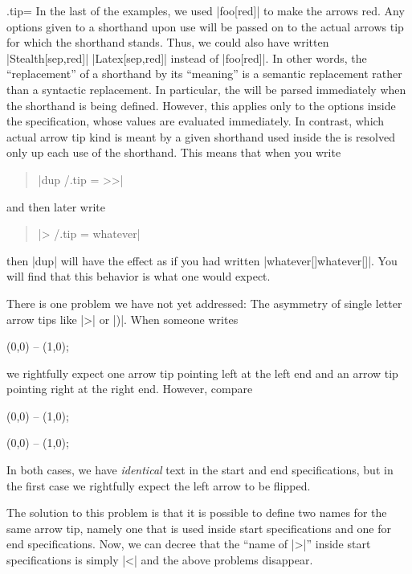 \begin{handler}{{.tip}{=}}
    In the last of the examples, we used |foo[red]| to make the arrows red. Any
    options given to a shorthand upon use will be passed on to the actual
    arrows tip for which the shorthand stands. Thus, we could also have written
    |Stealth[sep,red]| |Latex[sep,red]| instead of |foo[red]|. In other words,
    the ``replacement'' of a shorthand by its ``meaning'' is a semantic
    replacement rather than a syntactic replacement. In particular, the
     will be parsed immediately when the shorthand is
    being defined. However, this applies only to the options inside the
    specification, whose values are evaluated immediately. In contrast, which
    actual arrow tip kind is meant by a given shorthand used inside the
     is resolved only up each use of the shorthand.
    This means that when you write
    \begin{quote}
        |dup /.tip = >>|
    \end{quote}
    and then later write
    \begin{quote}
        |> /.tip = whatever|
    \end{quote}
    then |dup| will have the effect as if you had written
    |whatever[]whatever[]|. You will find that this behavior is what one would
    expect.

    There is one problem we have not yet addressed: The asymmetry of single
    letter arrow tips like |>| or |)|. When someone writes
\begin{codeexample}[]
\tikz \draw [<->] (0,0) -- (1,0);
\end{codeexample}
    we rightfully expect one arrow tip pointing left at the left end and an
    arrow tip pointing right at the right end. However, compare
\begin{codeexample}[]
\tikz \draw [>->] (0,0) -- (1,0);
\end{codeexample}
\begin{codeexample}[preamble={\usetikzlibrary{arrows.meta}}]
\tikz {} (0,0) -- (1,0);
\end{codeexample}
    In both cases, we have \emph{identical} text in the start and end
    specifications, but in the first case we rightfully expect the left arrow
    to be flipped.

    The solution to this problem is that it is possible to define two names for
    the same arrow tip, namely one that is used inside start specifications and
    one for end specifications. Now, we can decree that the ``name of |>|''
    inside start specifications is simply |<| and the above problems disappear.


\end{handler}
